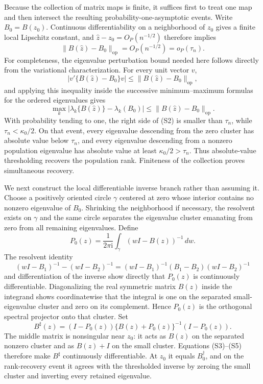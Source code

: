 Because the collection of matrix maps is finite, it suffices first to treat one map and then intersect the resulting probability-one-asymptotic events.  Write \(B_0=B(z_0)\).  Continuous differentiability on a neighborhood of \(z_0\) gives a finite local Lipschitz constant, and \(\widehat z-z_0=O_P(n^{-1/2})\) therefore implies
\[
 \|B(\widehat z)-B_0\|_{\mathrm{op}}=O_P(n^{-1/2})=o_P(\tau_n).
\tag{S1}
\]
For completeness, the eigenvalue perturbation bound needed here follows directly from the variational characterization.  For every unit vector \(v\),
\[
 |v'\{B(\widehat z)-B_0\}v|
 \le \|B(\widehat z)-B_0\|_{\mathrm{op}},
\]
and applying this inequality inside the successive minimum--maximum formulas for the ordered eigenvalues gives
\[
 \max_k|\lambda_k\{B(\widehat z)\}-\lambda_k(B_0)|
 \le \|B(\widehat z)-B_0\|_{\mathrm{op}}.
\tag{S2}
\]
With probability tending to one, the right side of (S2) is smaller than \(\tau_n\), while \(\tau_n<\kappa_0/2\).  On that event, every eigenvalue descending from the zero cluster has absolute value below \(\tau_n\), and every eigenvalue descending from a nonzero population eigenvalue has absolute value at least \(\kappa_0/2>\tau_n\).  Thus absolute-value thresholding recovers the population rank.  Finiteness of the collection proves simultaneous recovery.

We next construct the local differentiable inverse branch rather than assuming it.  Choose a positively oriented circle \(\gamma\) centered at zero whose interior contains no nonzero eigenvalue of \(B_0\).  Shrinking the neighborhood if necessary, the resolvent exists on \(\gamma\) and the same circle separates the eigenvalue cluster emanating from zero from all remaining eigenvalues.  Define
\[
 P_0(z)=\frac{1}{2\pi\mathrm i}\int_\gamma(wI-B(z))^{-1}\,dw.
\tag{S3}
\]
The resolvent identity
\[
 (wI-B_1)^{-1}-(wI-B_2)^{-1}
 =(wI-B_1)^{-1}(B_1-B_2)(wI-B_2)^{-1}
\tag{S4}
\]
and differentiation of the inverse show directly that \(P_0(z)\) is continuously differentiable.  Diagonalizing the real symmetric matrix \(B(z)\) inside the integrand shows coordinatewise that the integral is one on the separated small-eigenvalue cluster and zero on its complement.  Hence \(P_0(z)\) is the orthogonal spectral projector onto that cluster.  Set
\[
 B^\sharp(z)
 =(I-P_0(z))\{B(z)+P_0(z)\}^{-1}(I-P_0(z)).
\tag{S5}
\]
The middle matrix is nonsingular near \(z_0\): it acts as \(B(z)\) on the separated nonzero cluster and as \(B(z)+I\) on the small cluster.  Equations (S3)--(S5) therefore make \(B^\sharp\) continuously differentiable.  At \(z_0\) it equals \(B_0^\dagger\), and on the rank-recovery event it agrees with the thresholded inverse by zeroing the small cluster and inverting every retained eigenvalue.

